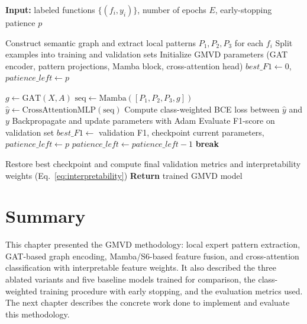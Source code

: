 \documentclass[12pt, a4paper, openright, twoside]{report}
\begin{document}
\begin{algorithm}[H]
\caption{GMVD Training Procedure (single vulnerability type)}
\label{alg:gmvd}

\begin{algorithmic}[1]

\STATE \textbf{Input:} labeled functions $\{(f_i, y_i)\}$, number of epochs $E$, early-stopping patience $p$

\STATE Construct semantic graph and extract local patterns $P_1,P_2,P_3$ for each $f_i$
\STATE Split examples into training and validation sets
\STATE Initialize GMVD parameters (GAT encoder, pattern projections, Mamba block, cross-attention head)
\STATE $best\_F1 \leftarrow 0$, $patience\_left \leftarrow p$

        \STATE $g \leftarrow \mathrm{GAT}(X, A)$ 
        \STATE $\mathrm{seq} \leftarrow \mathrm{Mamba}([P_1,P_2,P_3,g])$ 
        \STATE $\hat{y} \leftarrow \mathrm{CrossAttentionMLP}(\mathrm{seq})$ 
        \STATE Compute class-weighted BCE loss between $\hat{y}$ and $y$
        \STATE Backpropagate and update parameters with Adam
    \ENDFOR
    \STATE Evaluate F1-score on validation set
        \STATE $best\_F1 \leftarrow$ validation F1, checkpoint current parameters, $patience\_left \leftarrow p$
    \ELSE
        \STATE $patience\_left \leftarrow patience\_left - 1$
    \ENDIF
        \STATE \textbf{break}
    \ENDIF
\ENDFOR

\STATE Restore best checkpoint and compute final validation metrics and interpretability weights (Eq.~\ref{eq:interpretability})
\STATE \textbf{Return} trained GMVD model

\end{algorithmic}

\end{algorithm}

\section{Summary}
This chapter presented the GMVD methodology: local expert pattern extraction, GAT-based graph encoding, Mamba/S6-based feature fusion, and cross-attention classification with interpretable feature weights. It also described the three ablated variants and five baseline models trained for comparison, the class-weighted training procedure with early stopping, and the evaluation metrics used. The next chapter describes the concrete work done to implement and evaluate this methodology.
\end{document}
